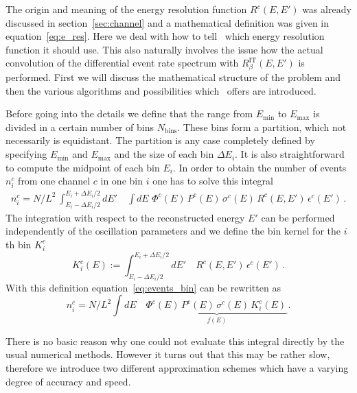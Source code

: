 The origin and meaning of the energy resolution function 
$R^c(E,E')$ was already discussed in 
section~\ref{sec:channel} and  a mathematical definition
was given in equation~\ref{eq:e_res}. Here we deal with
how to tell \GLOBES\ which energy resolution function it should
use. This also naturally involves the issue how the actual convolution
of the differential event rate spectrum with $R_\beta^{\text{IT}}(E,E')$
is performed. First we will discuss the mathematical structure of
the problem and then the various algorithms and possibilities which
\GLOBES\ offers are introduced. 


Before going into the details we define that the range from $E_\mathrm{min}$
to $E_\mathrm{max}$ is divided in a certain number of bins $N_\mathrm{bins}$.
These bins form a partition, which not necessarily is equidistant. The 
partition is any case completely defined by specifying $E_\mathrm{min}$
and $E_\mathrm{max}$ and the size of each bin  $\Delta E_i$. It is also
straightforward to compute the midpoint of each bin $E_i$.
In order to obtain the number of events 
$n_i^c$ from one channel $c$ in one bin $i$ one has to solve this integral
%
\begin{eqnarray}
\label{eq:events_bin}
n_i^c=N/L^2\,\int_{E_i-\Delta E_i/2}^{E_i+\Delta E_i/2} dE' 
\quad \int dE \,\, \Phi^c(E)\,
P^c(E)\,
\sigma^c(E)\,
R^c(E,E')\,
\epsilon^c(E')\,.
\end{eqnarray} 
%
The integration with respect to the reconstructed energy $E'$ can be
performed independently of the oscillation parameters and we define
the bin kernel for the $i$th bin $K_i^c$
\begin{equation}
\label{eq:kernel}
K_i^c(E):=\int_{E_i-\Delta E_i/2}^{E_i+\Delta E_i/2} dE' 
\quad R^c(E,E')\,
\epsilon^c(E')\,.
\end{equation}
With this definition equation~\ref{eq:events_bin} can be rewritten as
\begin{equation}
\label{eq:simple_int}
n_i^c=N/L^2 \int dE\quad  \underbrace{\Phi^c(E)\,
P^c(E)\,
\sigma^c(E)\,
K_i^c(E)\,}_{f(E)}. 
\end{equation}

There is no basic reason why one could not evaluate this integral directly
by the usual numerical methods. However it turns out that this may be rather
slow, therefore we introduce two different approximation schemes which have
a varying degree of accuracy and speed. 

